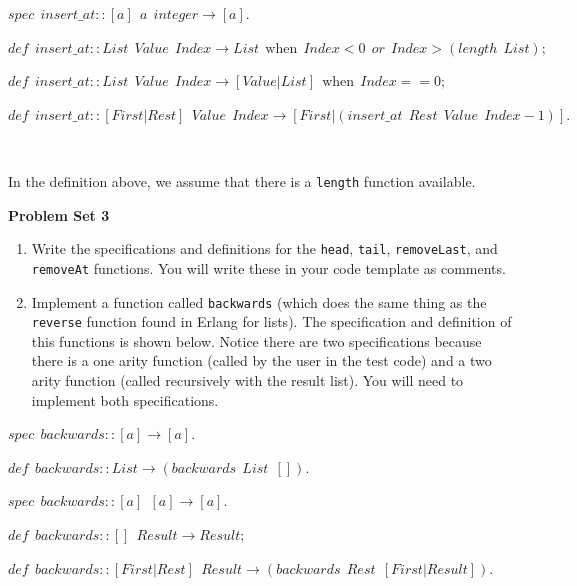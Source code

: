 \documentclass[
]{book}
\providecommand{\tightlist}{%
  \setlength{\itemsep}{0pt}\setlength{\parskip}{0pt}}
\begin{document}
\begin{formulabox}
\(spec ~ ~ insert\_at :: [a] ~ ~ a ~ ~ integer \rightarrow [a].\)

\(de\mathit{f} ~ ~ insert\_at :: List ~ ~ Value ~ ~ Index \rightarrow List ~ ~ \text{when} ~ ~ Index < 0 ~ ~ or ~ ~ Index > (length ~ ~ List);\)

\(de\mathit{f} ~ ~ insert\_at :: List ~ ~ Value ~ ~ Index \rightarrow [Value|List] ~ ~ \text{when} ~ ~ Index == 0;\)

\(de\mathit{f} ~ ~ insert\_at :: [First|Rest] ~ ~ Value ~ ~ Index \rightarrow [First|(insert\_at ~ ~ Rest ~ ~ Value ~ ~ Index-1)].\)

\end{formulabox}

\(\nonumber\)

In the definition above, we assume that there is a \texttt{length} function available.

\begin{problembox}

\textbf{Problem Set 3}

\begin{enumerate}
\def\labelenumi{\arabic{enumi}.}
\tightlist
\item
  Write the specifications and definitions for the \texttt{head}, \texttt{tail}, \texttt{removeLast}, and \texttt{removeAt} functions. You will write these in your code template as comments.
\item
  Implement a function called \texttt{backwards} (which does the same thing as the \texttt{reverse} function found in Erlang for lists). The specification and definition of this functions is shown below. Notice there are two specifications because there is a one arity function (called by the user in the test code) and a two arity function (called recursively with the result list). You will need to implement both specifications.
\end{enumerate}

\begin{formulabox}
\(spec ~ ~ backwards :: [a] \rightarrow [a].\)

\(de\mathit{f} ~ ~ backwards :: List \rightarrow (backwards ~ ~ List ~ ~ []).\)

\(spec ~ ~ backwards :: [a] ~ ~ [a] \rightarrow [a].\)

\(de\mathit{f} ~ ~ backwards :: [] ~ ~ Result \rightarrow Result;\)

\(de\mathit{f} ~ ~ backwards :: [First|Rest] ~ ~ Result \rightarrow (backwards ~ ~ Rest ~ ~ [First | Result]).\)

\end{formulabox}

\end{problembox}
\end{document}

